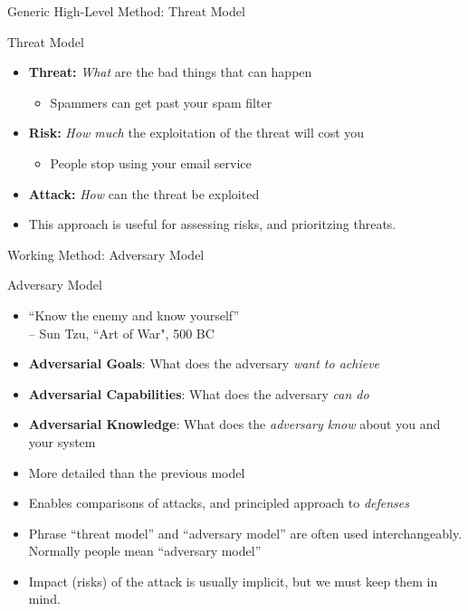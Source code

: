 \documentclass[10pt]{beamer}
\begin{document}
\begin{frame}[fragile]{Generic High-Level Method: Threat Model}

  \begin{alertblock}{Threat Model}
  \begin{itemize}[<+-| alert@+>]
    \item \textbf{Threat:} \emph{What} are the bad things that can happen
      \begin{itemize}
        \item Spammers can get past your spam filter
      \end{itemize}
    \item \textbf{Risk:} \emph{How much} the exploitation of the threat will cost you
        \begin{itemize}
          \item People stop using your email service
        \end{itemize}
    \item \textbf{Attack:} \emph{How} can the threat be exploited
  \end{itemize}
  \end{alertblock}

  \begin{itemize}[<+->]
    \item This approach is useful for assessing risks, and prioritzing threats.
  \end{itemize}

\end{frame}


\begin{frame}[fragile]{Working Method: Adversary Model}

  \begin{alertblock}{Adversary Model}
  \begin{itemize}[<+-| alert@+>]
    \item ``Know the enemy and know yourself'' \\
          -- Sun Tzu, ``Art of War", 500 BC
    \item \textbf{Adversarial Goals}: What does the adversary \emph{want to achieve}
    \item \textbf{Adversarial Capabilities}: What does the adversary \emph{can do}
    \item \textbf{Adversarial Knowledge}: What does the \emph{adversary know} about you and your system
  \end{itemize}
  \end{alertblock}

  \begin{itemize}[<+-| alert@+>]
    \item More detailed than the previous model
    \item Enables comparisons of attacks, and principled approach to \emph{defenses}
    \item Phrase ``threat model'' and ``adversary model'' are often used interchangeably. Normally
        people mean ``adversary model''
    \item Impact (risks) of the attack is usually implicit, but we must keep them in mind.
  \end{itemize}
\end{frame}
\end{document}
